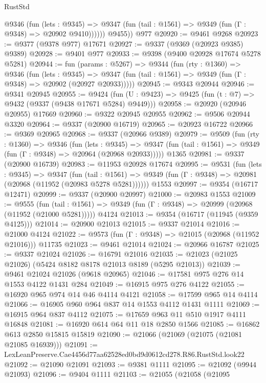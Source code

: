 \begin{lexlean}{RustStd}
\begin{coremodule}
            @9346
              (fun (lets : @9345) =>
              @9347 (fun (tail : @1561) => @9349 (fun (Γ : @9348) => @20902 @9410))))))
        @9455))
    @977
@20920 := @9461 @9268
@20923 := @9377 (@9378 @977) @17671
@20927 := @9337 (@9369 (@20923 @9385) @9389)
@20928 := @9401 @977
@20933 := @9398 (@9400 @20928 @17674 @5278 @5281)
@20944 := fun (params : @5267) =>
  @9344
    (fun (rty : @1360) =>
    @9346
      (fun (lets : @9345) =>
      @9347 (fun (tail : @1561) => @9349 (fun (Γ : @9348) => @20902 (@20927 @20933)))))
@20945 := @9343 @20944
@20946 := @9341 @20945
@20955 := @9424
    (fun (U : @9423) => @9425 (fun (t : @7) => @9432 (@9337 (@9438 @17671 @5284) @9449)))
@20958 := @20920 (@20946 @20955) @17669
@20960 := @9322 @20945 @20955
@20962 := @9506 @20944 @3320
@20964 := @9337 (@20900 @16719)
@20965 := @20923 @16722
@20966 := @9369 @20965
@20968 := @9337 (@20966 @9389)
@20979 := @9509
    (fun (rty : @1360) =>
    @9346
      (fun (lets : @9345) =>
      @9347 (fun (tail : @1561) => @9349 (fun (Γ : @9348) => @20964 (@20968 @20933)))))
    @1365
@20981 := @9337 (@20900 @16739)
@20983 := @11953 @20928 @17674
@20995 := @9531
    (fun (lets : @9345) =>
    @9347
      (fun (tail : @1561) =>
      @9349 (fun (Γ : @9348) => @20981 (@20968 (@11952 (@20983 @5278 @5281))))))
    @1553
@20997 := @9354 (@16717 @12471)
@20999 := @9337 (@20900 @20997)
@21000 := @20983 @1553
@21009 := @9555
    (fun (tail : @1561) => @9349 (fun (Γ : @9348) => @20999 (@20968 (@11952 (@21000 @5281)))))
    @4124
@21013 := @9354 (@16717 (@11945 (@9359 @4125)))
@21014 := @20900 @21013
@21015 := @9337 @21014
@21016 := @21000 @4124
@21022 := @9573 (fun (Γ : @9348) => @21015 (@20968 (@11952 @21016))) @11735
@21023 := @9461 @21014
@21024 := @20966 @16787
@21025 := @9337 @21024
@21026 := @16791 @21016
@21035 := @21023 (@21025 @21026) (@5424 @8182 @8178 @21013 @8189 (@5295 @21013))
@21039 := @9461 @21024 @21026 (@9618 @20965)
@21046 := @17581 @975 @276 @14 @1553 @4122 @1431 @284
@21049 := @16915 @975 @276 @4122
@21055 := @16920 @965 @974 @14 @46 @4114 @4121
@21058 := @17599 @965 @14 @4114
@21066 := @16905 @960 @964 @837 @14 @1553 @4112 @1431 @1111
@21069 := @16915 @964 @837 @4112
@21075 := @17659 @963 @11 @510 @1917 @4111 @16848
@21081 := @16920 @614 @64 @11 @18 @2850 @1566
@21085 := @16862 @613 @2850 @15815 @15819
@21090 := @21066 (@21069 (@21075 (@21081 @21085 @16939)))
@21091 := LexLeanPreserve.Cae4456d77aa62528ed0bd9d0612cd278.R86.RustStd.look22
@21092 := @21090 @21091
@21093 := @9381 @1111
@21095 := @21092 (@9944 @21093)
@21096 := @9404 @1111
@21103 := @21055
    (@21058
      (@21095

\end{coremodule}
\end{lexlean}
